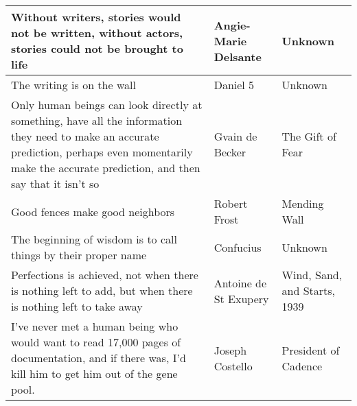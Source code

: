 \documentclass{article}
\begin{document}
    \begin{tabularx}{0.8\textwidth} { 
        | >{\centering\arraybackslash}X 
        | >{\centering\arraybackslash}X 
        |  >{\centering\arraybackslash}X |}
        
        \hline

        Without writers, stories would not be written, without actors, stories could not be brought to life
        & Angie-Marie Delsante
        & Unknown \\

        \hline

        The writing is on the wall 
        & Daniel 5 
        & Unknown \\

        \hline

        Only human beings can look directly at something, have all the information they need to make an accurate prediction, perhaps even momentarily make the accurate prediction, and then say that it isn't so
        & Gvain de Becker
        & The Gift of Fear
        \\

        \hline

        Good fences make good neighbors 
        & Robert Frost
        &Mending Wall \\

        \hline

        The beginning of wisdom is to call things by their proper name
        & Confucius
        & Unknown
        \\

        \hline

        Perfections is achieved, not when there is nothing left to add, but when there is nothing left to take away
        & Antoine de St Exupery
        & Wind, Sand, and Starts, 1939 \\

        \hline

        I've never met a human being who would want to read 17,000 pages of documentation, and if there was, I'd kill him to get him out of the gene pool.
        & Joseph Costello
        & President of Cadence 
        \\

        \hline
    
        \hline
    \end{tabularx}
\end{document}
